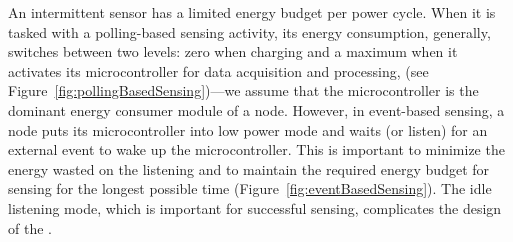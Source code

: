 %
An intermittent sensor has a limited energy budget per power cycle. When it is tasked with a polling-based sensing activity, its energy consumption, generally, switches between two levels: zero when charging and a maximum when it activates its microcontroller for data acquisition and processing, (see Figure~\ref{fig:pollingBasedSensing})---we assume that the microcontroller is the dominant energy consumer module of a node. However, in event-based sensing, a node puts its microcontroller into low power mode and waits (or listen) for an external event to wake up the microcontroller. This is important to minimize the energy wasted on the listening and to maintain the required energy budget for sensing for the longest possible time (Figure~\ref{fig:eventBasedSensing}). The idle listening mode, which is important for successful sensing, complicates the design of the \sys.


